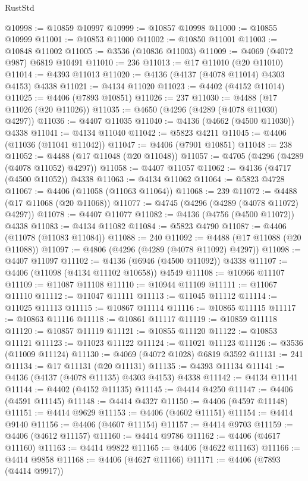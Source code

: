 \begin{lexlean}{RustStd}
\begin{coremodule}
@10998 := @10859 @10997
@10999 := @10857 @10998
@11000 := @10855 @10999
@11001 := @10853 @11000
@11002 := @10850 @11001
@11003 := @10848 @11002
@11005 := @3536 (@10836 @11003)
@11009 := @4069 (@4072 @987) @6819 @10491
@11010 := 236
@11013 := @17 @11010 (@20 @11010)
@11014 := @4393 @11013
@11020 := @4136 (@4137 (@4078 @11014) @4303 @4153) @4338
@11021 := @4134 @11020
@11023 := @4402 (@4152 @11014)
@11025 := @4406 (@7893 @10851)
@11026 := 237
@11030 := @4488 (@17 @11026 (@20 @11026))
@11035 := @4650 (@4296 (@4289 (@4078 @11030) @4297))
@11036 := @4407 @11035
@11040 := @4136 (@4662 (@4500 @11030)) @4338
@11041 := @4134 @11040
@11042 := @5823 @4211
@11045 := @4406 (@11036 (@11041 @11042))
@11047 := @4406 (@7901 @10851)
@11048 := 238
@11052 := @4488 (@17 @11048 (@20 @11048))
@11057 := @4705 (@4296 (@4289 (@4078 @11052) @4297))
@11058 := @4407 @11057
@11062 := @4136 (@4717 (@4500 @11052)) @4338
@11063 := @4134 @11062
@11064 := @5823 @4728
@11067 := @4406 (@11058 (@11063 @11064))
@11068 := 239
@11072 := @4488 (@17 @11068 (@20 @11068))
@11077 := @4745 (@4296 (@4289 (@4078 @11072) @4297))
@11078 := @4407 @11077
@11082 := @4136 (@4756 (@4500 @11072)) @4338
@11083 := @4134 @11082
@11084 := @5823 @4790
@11087 := @4406 (@11078 (@11083 @11084))
@11088 := 240
@11092 := @4488 (@17 @11088 (@20 @11088))
@11097 := @4806 (@4296 (@4289 (@4078 @11092) @4297))
@11098 := @4407 @11097
@11102 := @4136 (@6946 (@4500 @11092)) @4338
@11107 := @4406 (@11098 (@4134 @11102 @10658)) @4549
@11108 := @10966 @11107
@11109 := @11087 @11108
@11110 := @10944 @11109
@11111 := @11067 @11110
@11112 := @11047 @11111
@11113 := @11045 @11112
@11114 := @11025 @11113
@11115 := @10867 @11114
@11116 := @10865 @11115
@11117 := @10863 @11116
@11118 := @10861 @11117
@11119 := @10859 @11118
@11120 := @10857 @11119
@11121 := @10855 @11120
@11122 := @10853 @11121
@11123 := @11023 @11122
@11124 := @11021 @11123
@11126 := @3536 (@11009 @11124)
@11130 := @4069 (@4072 @1028) @6819 @3592
@11131 := 241
@11134 := @17 @11131 (@20 @11131)
@11135 := @4393 @11134
@11141 := @4136 (@4137 (@4078 @11135) @4303 @4153) @4338
@11142 := @4134 @11141
@11144 := @4402 (@4152 @11135)
@11145 := @4414 @4250
@11147 := @4406 (@4591 @11145)
@11148 := @4414 @4327
@11150 := @4406 (@4597 @11148)
@11151 := @4414 @9629
@11153 := @4406 (@4602 @11151)
@11154 := @4414 @9140
@11156 := @4406 (@4607 @11154)
@11157 := @4414 @9703
@11159 := @4406 (@4612 @11157)
@11160 := @4414 @9786
@11162 := @4406 (@4617 @11160)
@11163 := @4414 @9822
@11165 := @4406 (@4622 @11163)
@11166 := @4414 @9858
@11168 := @4406 (@4627 @11166)
@11171 := @4406 (@7893 (@4414 @9917))

\end{coremodule}
\end{lexlean}
